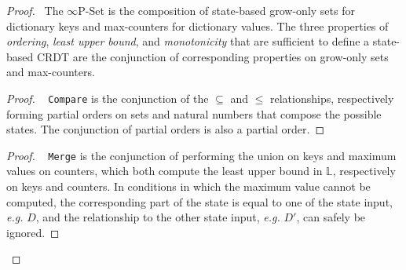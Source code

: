\documentclass[10pt, oneside]{article}   	%
\begin{document}
\begin{proof}
	\pfsketch ~The $\infty$P-Set is the composition of state-based grow-only sets for dictionary keys and max-counters for dictionary values. The three properties of \textit{ordering}, \textit{least upper bound}, and \textit{monotonicity} that are sufficient to define a state-based CRDT are the conjunction of corresponding properties on grow-only sets and max-counters.
	
	\label{proof:state-crdt}
	\begin{proof}
		\pfsketch~ \texttt{Compare} is the conjunction of the $\subseteq$ and $\leq$ relationships, respectively forming partial orders on sets and natural numbers that compose the possible states. The conjunction of partial orders is also a partial order.		
	\end{proof}
% 
%
	
	\begin{proof}
			\pfsketch~ \texttt{Merge} is the conjunction of performing the union on keys and maximum values on counters, which both compute the least upper bound in $\mathds{L}$, respectively on keys and counters. In conditions in which the maximum value cannot be computed, the corresponding part of the state is equal to one of the state input, \textit{e.g.} $D$, and the relationship to the other state input, \textit{e.g.} $D'$, can safely be ignored.
	\end{proof}


\end{proof}
\end{document}
